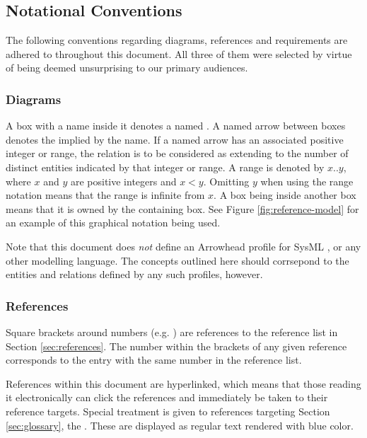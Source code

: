 \subsection{Notational Conventions}
\label{sec:introduction:conventions}

The following conventions regarding diagrams, references and requirements are adhered to throughout this document.
All three of them were selected by virtue of being deemed unsurprising to our primary audiences.

\subsubsection{Diagrams}

A box with a name inside it denotes a named .
A named arrow between boxes denotes the  implied by the name.
If a named arrow has an associated positive integer or range, the relation is to be considered as extending to the number of distinct entities indicated by that integer or range.
A range is denoted by $x..y$, where $x$ and $y$ are positive integers and $x<y$.
Omitting $y$ when using the range notation means that the range is infinite from $x$.
A box being inside another box means that it is owned by the containing box.
See Figure \ref{fig:reference-model} for an example of this graphical notation being used.

Note that this document does \textit{not} define an Arrowhead profile for SysML \cite{omg2019sysml}, or any other modelling language.
The concepts outlined here should corrsepond to the entities and relations defined by any such profiles, however.

\subsubsection{References}

Square brackets around numbers (e.g. \cite{delsing2017iot}) are references to the reference list in Section \ref{sec:references}.
The number within the brackets of any given reference corresponds to the entry with the same number in the reference list.

References within this document are hyperlinked, which means that those reading it electronically can click the references and immediately be taken to their reference targets.
Special treatment is given to references targeting Section \ref{sec:glossary}, the .
These are displayed as regular text rendered with blue color.

